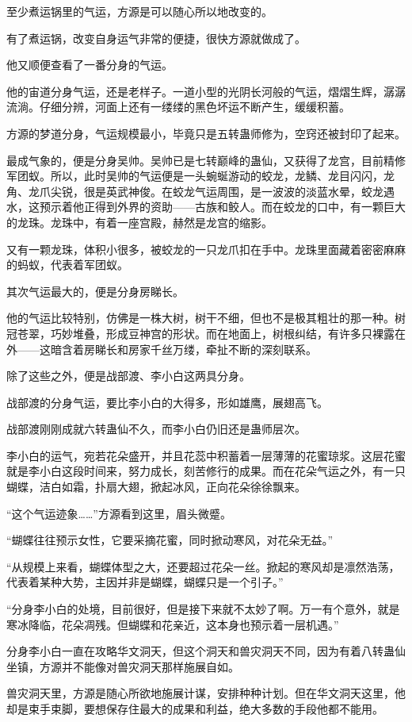 \begin{this_body}
至少煮运锅里的气运，方源是可以随心所以地改变的。

有了煮运锅，改变自身运气非常的便捷，很快方源就做成了。

他又顺便查看了一番分身的气运。

他的宙道分身气运，还是老样子。一道小型的光阴长河般的气运，熠熠生辉，潺潺流淌。仔细分辨，河面上还有一缕缕的黑色坏运不断产生，缓缓积蓄。

方源的梦道分身，气运规模最小，毕竟只是五转蛊师修为，空窍还被封印了起来。

最成气象的，便是分身吴帅。吴帅已是七转巅峰的蛊仙，又获得了龙宫，目前精修军团蚁。所以，此时吴帅的气运便是一头蜿蜒游动的蛟龙，龙鳞、龙目闪闪，龙角、龙爪尖锐，很是英武神俊。在蛟龙气运周围，是一波波的淡蓝水晕，蛟龙遇水，这预示着他正得到外界的资助——古族和鲛人。而在蛟龙的口中，有一颗巨大的龙珠。龙珠中，有着一座宫殿，赫然是龙宫的缩影。

又有一颗龙珠，体积小很多，被蛟龙的一只龙爪扣在手中。龙珠里面藏着密密麻麻的蚂蚁，代表着军团蚁。

其次气运最大的，便是分身房睇长。

他的气运比较特别，仿佛是一株大树，树干不细，但也不是极其粗壮的那一种。树冠苍翠，巧妙堆叠，形成豆神宫的形状。而在地面上，树根纠结，有许多只裸露在外——这暗含着房睇长和房家千丝万缕，牵扯不断的深刻联系。

除了这些之外，便是战部渡、李小白这两具分身。

战部渡的分身气运，要比李小白的大得多，形如雄鹰，展翅高飞。

战部渡刚刚成就六转蛊仙不久，而李小白仍旧还是蛊师层次。

李小白的运气，宛若花朵盛开，并且花蕊中积蓄着一层薄薄的花蜜琼浆。这层花蜜就是李小白这段时间来，努力成长，刻苦修行的成果。而在花朵气运之外，有一只蝴蝶，洁白如霜，扑扇大翅，掀起冰风，正向花朵徐徐飘来。

“这个气运迹象……”方源看到这里，眉头微蹙。

“蝴蝶往往预示女性，它要采摘花蜜，同时掀动寒风，对花朵无益。”

“从规模上来看，蝴蝶体型之大，还要超过花朵一丝。掀起的寒风却是凛然浩荡，代表着某种大势，主因并非是蝴蝶，蝴蝶只是一个引子。”

“分身李小白的处境，目前很好，但是接下来就不太妙了啊。万一有个意外，就是寒冰降临，花朵凋残。但蝴蝶和花亲近，这本身也预示着一层机遇。”

分身李小白一直在攻略华文洞天，但这个洞天和兽灾洞天不同，因为有着八转蛊仙坐镇，方源并不能像对兽灾洞天那样施展自如。

兽灾洞天里，方源是随心所欲地施展计谋，安排种种计划。但在华文洞天这里，他却是束手束脚，要想保存住最大的成果和利益，绝大多数的手段他都不能用。


\end{this_body}
